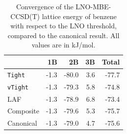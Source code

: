 \begin{table}[h]

\caption{\label{tab:x23_benzene_lno_conv}Convergence of the LNO-MBE-CCSD(T) lattice energy of benzene with respect to the LNO threshold, compared to the canonical result. All values are in kJ/mol.}
\begin{tabular}{lrrrr}
\toprule
 & 1B & 2B & 3B & Total \\ 
\midrule
{\tt Tight} & -1.3 & -80.0 & 3.6 & -77.7 \\
{\tt vTight} & -1.3 & -79.3 & 5.8 & -74.8 \\
LAF & -1.3 & -78.9 & 6.8 & -73.4 \\
Composite & -1.3 & -79.6 & 5.3 & -75.7 \\
Canonical & -1.3 & -79.0 & 4.7 & -75.6 \\
\bottomrule
\end{tabular}

\end{table}